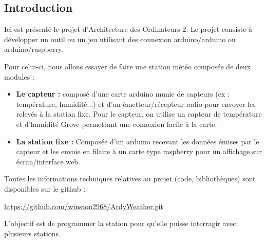 \documentclass[a4paper]{article}
\begin{document}



\tableofcontents


\justify

\subsection{Introduction}


Ici est présenté le projet d'Architecture des Ordinateurs 2. Le projet consiste à développer un outil ou un jeu 
utilisant des connexion arduino/arduino ou arduino/raspberry. 

Pour celui-ci, nous allons essayer de faire une station météo composée de deux modules : 
\begin{itemize}
    \item \textbf{Le capteur : } composé d'une carte arduino munie de capteurs (ex : température, humidité...) et d'un émetteur/récepteur 
    radio pour envoyer les relevés à la station fixe. 
    Pour le capteur, on utilise un {capteur de température et d'humidité Grove} permettant 
    une connexion facile à la carte. 
    \item \textbf{La station fixe : } Composée d'un arduino recevant les données émises par le capteur et les envoie en filaire 
    à un carte type raspberry pour un affichage sur écran/interface web. 
\end{itemize}

Toutes les informations techniques relatives au projet (code, bibliothèques) sont disponibles sur le github : 
\begin{center}
    \href{https://github.com/winston2968/ArdyWeather.git}{https://github.com/winston2968/ArdyWeather.git}
\end{center}

L'objectif est de programmer la station pour qu'elle puisse interragir avec plusieurs 
stations. 


\newpage 

\end{document}

